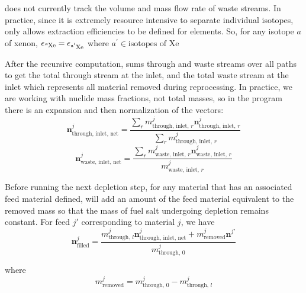 \SaltProc does not currently track the volume and mass flow rate of waste streams.
In practice, since it is extremely resource intensive to separate individual
isotopes, \SaltProc only allows extraction efficiencies to be defined for
elements. So, for any isotope $a$ of xenon,
$\epsilon_{\ce{^{a}Xe}} = \epsilon_{\ce{^{a^{\prime}}Xe}}$  where
$a^{\prime} \in \text{isotopes of Xe}$

After the recursive computation, \SaltProc sums through and waste streams over all
paths to get the total through stream at the inlet, and the total waste stream at
the inlet which represents all material removed during reprocessing. In practice,
we are working with nuclide mass fractions, not total masses, so in the program
there is an expansion and then normalization of the vectors:
\begin{equation}
    \mathbf{n}^{j}_\text{through, inlet, net} = \frac{\sum_{r} m^{j}_{\text{through, inlet, }r} \mathbf{n}^{j}_{\text{through, inlet, }r}}{\sum_{r} m^{j}_{\text{through, inlet, }r}}
\end{equation}
\begin{equation}
    \mathbf{n}^{j}_{\text{waste, inlet, net}} = \frac{\sum_{r} m^{j}_{\text{waste, inlet, }r} \mathbf{n}^{j}_{\text{waste, inlet, }r}}{m^{j}_{\text{waste, inlet, }r}}
\end{equation}

Before running the next depletion step, for any material that has an associated
feed material defined, \SaltProc will add an amount of the feed material
equivalent to the removed mass so that the mass of fuel salt undergoing depletion
remains constant. For feed $j'$ corresponding to material $j$, we have
\begin{equation}
    \mathbf{n}^{j}_\text{filled} = \frac{m^{j}_{\text{through, }l}\mathbf{n}^{j}_\text{through, inlet, net} +  m^{j}_{\text{removed}}\mathbf{n}^{j'}}{m^{j}_{\text{through, }0}}
\end{equation}

where 
\begin{equation}
    m^{j}_\text{removed} = m^{j}_{\text{through, }0} - m^{j}_{\text{through, }l}
\end{equation}
